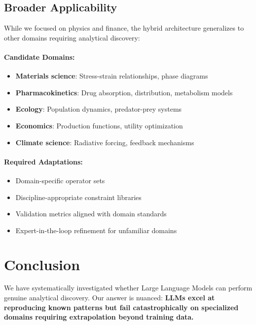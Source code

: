 \subsection{Broader Applicability}

While we focused on physics and finance, the hybrid architecture generalizes to other domains requiring analytical discovery:

\paragraph{Candidate Domains:}
\begin{itemize}
\item \textbf{Materials science}: Stress-strain relationships, phase diagrams
\item \textbf{Pharmacokinetics}: Drug absorption, distribution, metabolism models
\item \textbf{Ecology}: Population dynamics, predator-prey systems
\item \textbf{Economics}: Production functions, utility optimization
\item \textbf{Climate science}: Radiative forcing, feedback mechanisms
\end{itemize}

\paragraph{Required Adaptations:}
\begin{itemize}
\item Domain-specific operator sets
\item Discipline-appropriate constraint libraries
\item Validation metrics aligned with domain standards
\item Expert-in-the-loop refinement for unfamiliar domains
\end{itemize}


\section{Conclusion}

We have systematically investigated whether Large Language Models can perform genuine analytical discovery. Our answer is nuanced: \textbf{LLMs excel at reproducing known patterns but fail catastrophically on specialized domains requiring extrapolation beyond training data.}


